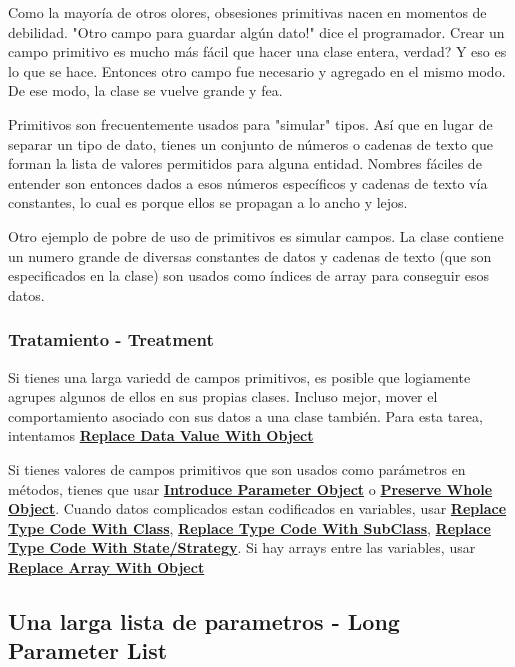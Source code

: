 \documentclass[11pt,a4paper,oneside]{book}
\begin{document}
Como la mayoría de otros olores, obsesiones primitivas nacen en momentos de debilidad. "Otro campo para guardar algún dato!" dice el programador. Crear un campo primitivo es mucho más fácil que hacer una clase entera, verdad? Y eso es lo que se hace. Entonces otro campo fue necesario y agregado en el mismo modo. De ese modo, la clase se vuelve grande y fea. 

Primitivos son frecuentemente usados para "simular" tipos. Así que en lugar de separar un tipo de dato, tienes un conjunto de números o cadenas de texto que forman la lista de valores permitidos para alguna entidad. Nombres fáciles de entender son entonces dados a esos números específicos y cadenas de texto vía constantes, lo cual es porque ellos se propagan a lo ancho y lejos.

Otro ejemplo de pobre de uso de primitivos es simular campos. La clase contiene un numero grande de diversas constantes de datos y cadenas de texto  (que son especificados en la clase) son usados como índices de array para conseguir esos datos. 


\subsubsection{Tratamiento - Treatment}

Si tienes una larga variedd de campos primitivos, es posible que logiamente agrupes algunos de ellos en sus propias clases. Incluso mejor, mover el comportamiento asociado con sus datos a una clase también. Para esta tarea, intentamos \hyperref[replacedatavaluewithobject]{\textbf{Replace Data Value With Object}}

Si tienes valores de campos primitivos que son usados como parámetros en métodos, tienes que usar \hyperref[introduceparameterobject]{\textbf{Introduce Parameter Object}} o \hyperref[preservewholeobject]{ \textbf{Preserve Whole Object}}. Cuando datos complicados estan codificados en variables, usar \hyperref[replacetypecodewithclass]{\textbf{Replace Type Code With Class}}, \hyperref[replacetypecodewithsubclass]{\textbf{Replace Type Code With SubClass}}, \hyperref[replacetypecodewithstate/strategy]{\textbf{Replace Type Code With State/Strategy}}. Si hay arrays entre las variables, usar \hyperref[replacearraywithobject]{\textbf{Replace Array With Object}}


\subsection{Una larga lista de parametros -   Long Parameter List}
\label{longparameterlist}
\end{document}
